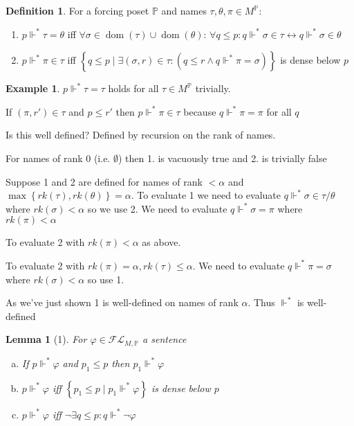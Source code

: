 \documentclass{scrartcl}
\newcommand{\set}[1]{\left\{#1\right\}}
\DeclareMathOperator{\dom}{dom}
\theoremstyle{definition}
\newtheorem*{definition*}{Definition}
\newtheorem*{example*}{Example}
\theoremstyle{plain}
\newtheorem*{lemma*}{Lemma}
\theoremstyle{remark}
\begin{document}
	\begin{definition*}
		For a forcing poset $\mathbb{P}$ and names $\tau, \theta, \pi \in M^\mathbb{P}$:
		\begin{enumerate}[1.]
			\item $p \Vdash^* \tau = \theta$ iff $\forall \sigma \in \dom(\tau) \cup \dom(\theta)$:
			$\forall q \leq p: q \Vdash^* \sigma \in \tau \longleftrightarrow q \Vdash^* \sigma \in \theta$

			\item $p \Vdash^* \pi \in \tau$ iff $\set{q \leq p \mid \exists (\sigma, r) \in \tau: (q \leq r \land q \Vdash^* \pi = \sigma)}$ 
			is dense below $p$
		\end{enumerate}
	\end{definition*}

	\begin{example*}
		$p \Vdash^* \tau = \tau$ holds for all $\tau \in M^\mathbb{P}$ trivially.

		If $(\pi, r') \in \tau$ and $p \leq r'$ then $p \Vdash^* \pi \in \tau$ because $q \Vdash^* \pi = \pi$ for all $q$
	\end{example*}

	Is this well defined? Defined by recursion on the rank of names.

	For names of rank $0$ (i.e. $\emptyset$) then 1. is vacuously true and 2. is trivially false

	Suppose 1 and 2 are defined for names of rank $< \alpha$ and 
	$\max\set{rk(\tau), rk(\theta)} = \alpha$. To evaluate 1 we need
	to evaluate $q \Vdash^* \sigma \in \tau/\theta$ where $rk(\sigma) < \alpha$
	so we use 2. We need to evaluate $q \Vdash^* \sigma = \pi$ where $rk(\pi) < \alpha$

	To  evaluate 2 with $rk(\pi) < \alpha$ as above.

	To evaluate 2 with $rk(\pi) = \alpha, rk(\tau) \leq \alpha$.
	We need to evaluate $q \Vdash^* \pi = \sigma$ where $rk(\sigma) < \alpha$
	so use 1.

	As we've just shown 1 is well-defined on names of rank $\alpha$.
	Thus $\Vdash^*$ is well-defined

	\begin{lemma*}[1]
		For $\varphi \in \mathcal{FL}_{M, \mathbb{P}}$ a sentence
		\begin{enumerate}[(a)]
			\item If $p \Vdash^* \varphi$ and $p_1 \leq p$ then $p_1 \Vdash^* \varphi$

			\item $p \Vdash^* \varphi$ iff $\set{p_1 \leq p \mid p_1 \Vdash^* \varphi}$ is dense below $p$

			\item $p \Vdash^* \varphi$ iff $\lnot \exists q \leq p: q \Vdash^* \lnot \varphi$
		\end{enumerate}
	\end{lemma*}
\end{document}
